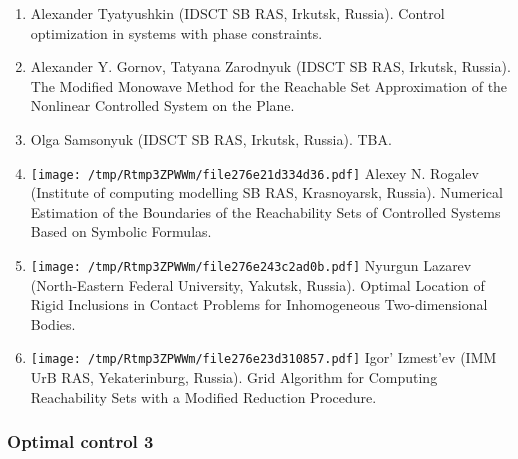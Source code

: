 \documentclass[
]{article}
\providecommand{\tightlist}{%
  \setlength{\itemsep}{0pt}\setlength{\parskip}{0pt}}
\begin{document}
\begin{enumerate}
\def\labelenumi{\arabic{enumi}.}
\tightlist
\item
  Alexander Tyatyushkin (IDSCT SB RAS, Irkutsk, Russia). Control
  optimization in systems with phase constraints.
\item
  Alexander Y. Gornov, Tatyana Zarodnyuk (IDSCT SB RAS, Irkutsk,
  Russia). The Modiﬁed Monowave Method for the Reachable Set
  Approximation of the Nonlinear Controlled System on the Plane.
\item
  Olga Samsonyuk (IDSCT SB RAS, Irkutsk, Russia). TBA.
\item
  \protect\texttt{[image: /tmp/Rtmp3ZPWWm/file276e21d334d36.pdf]}
  Alexey N. Rogalev (Institute of computing modelling SB RAS,
  Krasnoyarsk, Russia). Numerical Estimation of the Boundaries of the
  Reachability Sets of Controlled Systems Based on Symbolic Formulas.
\item
  \protect\texttt{[image: /tmp/Rtmp3ZPWWm/file276e243c2ad0b.pdf]}
  Nyurgun Lazarev (North-Eastern Federal University, Yakutsk, Russia).
  Optimal Location of Rigid Inclusions in Contact Problems for
  Inhomogeneous Two-dimensional Bodies.
\item
  \protect\texttt{[image: /tmp/Rtmp3ZPWWm/file276e23d310857.pdf]}
  Igor' Izmest'ev (IMM UrB RAS, Yekaterinburg, Russia). Grid Algorithm
  for Computing Reachability Sets with a Modified Reduction Procedure.
\end{enumerate}

\hypertarget{oc3}{%
\subsubsection{Optimal control 3}\label{oc3}}
\end{document}
